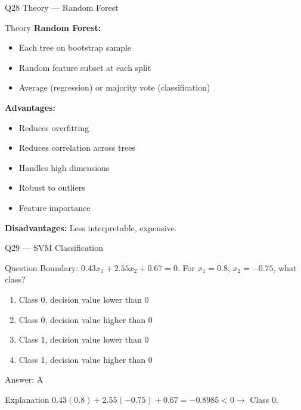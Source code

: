 \documentclass[aspectratio=169,8pt]{beamer}
\begin{document}
	\begin{frame}{Q28 Theory --- Random Forest}
		\begin{block}{Theory}
			\textbf{Random Forest:}
			\begin{itemize}
				\item Each tree on bootstrap sample\item Random feature subset at each split
				\item Average (regression) or majority vote (classification)
			\end{itemize}
			\textbf{Advantages:}
			\begin{itemize}
				\item Reduces overfitting
				\item Reduces correlation across trees
				\item Handles high dimensions
				\item Robust to outliers
				\item Feature importance
			\end{itemize}
			\textbf{Disadvantages:} Less interpretable, expensive.
		\end{block}
	\end{frame}
	
	\begin{frame}{Q29 --- SVM Classification}
		\begin{block}{Question}
			Boundary: $0.43x_1 + 2.55x_2 + 0.67 = 0$. For $x_1 = 0.8$, $x_2 = -0.75$, what class?
		\end{block}
		\begin{enumerate}[label=\Alph*.]
			\item Class 0, decision value lower than 0
			\item Class 0, decision value higher than 0
			\item Class 1, decision value lower than 0
			\item Class 1, decision value higher than 0
		\end{enumerate}
		\begin{exampleblock}{Answer: A}
		\end{exampleblock}
		\begin{block}{Explanation}
			$0.43(0.8) + 2.55(-0.75) + 0.67 = -0.8985 < 0 \rightarrow$ Class 0.
		\end{block}
	\end{frame}
	
\end{document}
